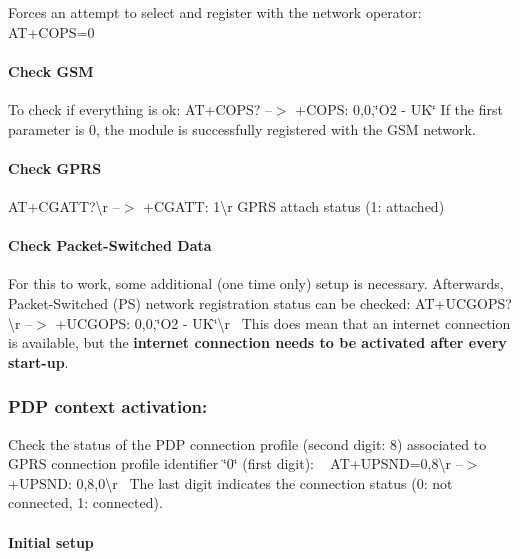 Forces an attempt to select and register with the network operator\+: {\ttfamily A\+T+\+C\+O\+PS=0}

\paragraph*{Check G\+SM}

To check if everything is ok\+: {\ttfamily A\+T+\+C\+O\+PS?} --$>$ {\ttfamily +\+C\+O\+PS\+: 0,0,\char`\"{}\+O2 -\/ U\+K\char`\"{}} If the first parameter is 0, the module is successfully registered with the G\+SM network.

\paragraph*{Check G\+P\+RS}

{\ttfamily A\+T+\+C\+G\+A\+TT?\textbackslash{}r} --$>$ {\ttfamily +\+C\+G\+A\+TT\+: 1\textbackslash{}r} G\+P\+RS attach status (1\+: attached)

\paragraph*{Check Packet-\/\+Switched Data}

For this to work, some additional (one time only) setup is necessary. Afterwards, Packet-\/\+Switched (PS) network registration status can be checked\+: {\ttfamily A\+T+\+U\+C\+G\+O\+PS?\textbackslash{}r} --$>$ {\ttfamily +\+U\+C\+G\+O\+PS\+: 0,0,\char`\"{}\+O2 -\/ U\+K\char`\"{}\textbackslash{}r}~\newline
 This does mean that an internet connection is available, but the {\bfseries internet connection needs to be activated after every start-\/up}.

\subsubsection*{P\+DP context activation\+:}

Check the status of the P\+DP connection profile (second digit\+: 8) associated to G\+P\+RS connection profile identifier \char`\"{}0\char`\"{} (first digit)\+: ~\newline
 {\ttfamily A\+T+\+U\+P\+S\+ND=0,8\textbackslash{}r} --$>$ {\ttfamily +\+U\+P\+S\+ND\+: 0,8,0\textbackslash{}r}~\newline
 The last digit indicates the connection status (0\+: not connected, 1\+: connected).

\paragraph*{Initial setup}

